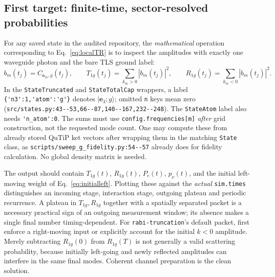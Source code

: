 \documentclass[11pt,a4paper]{article}
\newcommand{\ket}[1]{\lvert #1\rangle}
\newcommand{\code}[1]{\nolinkurl{#1}}
\begin{document}
\subsection{First target: finite-time, sector-resolved probabilities}
For any saved state in the audited repository, the \emph{mathematical} operation corresponding to Eq.~\eqref{eq:localTR} is to inspect the amplitudes with exactly one waveguide photon and the bare TLS ground label:
\begin{equation}
 b_m(t_j)=C_{\mathbf e_m,g}(t_j),\qquad
 T_{1g}(t_j)=\sum_{k_m>0}|b_m(t_j)|^2,\qquad
 R_{1g}(t_j)=\sum_{k_m<0}|b_m(t_j)|^2.
 \label{eq:bm}
\end{equation}
In the \code{StateTruncated} and \code{StateTotalCap} wrappers, a label \code{\{'n3':1,'atom':'g'\}} denotes $\ket{\mathbf e_3;g}$; omitted \code{n} keys mean zero (\code{src/states.py:43--53,66--87,140--167,232--248}). The \code{StateAtom} label also needs \code{'n_atom':0}. The sums must use \code{config.frequencies[m]} \emph{after} grid construction, not the requested mode count. One may compute these from already stored QuTiP ket vectors after wrapping them in the matching \code{State} class, as \code{scripts/sweep_g_fidelity.py:54--57} already does for fidelity calculation. No global density matrix is needed.

The output should contain $T_{1g}(t)$, $R_{1g}(t)$, $P_e(t)$, $p_\nu(t)$, and the initial left-moving weight of Eq.~\eqref{eq:initialleft}. Plotting these against the \emph{actual} \code{sim.times} distinguishes an incoming stage, interaction stage, outgoing plateau and periodic recurrence. A plateau in $T_{1g},R_{1g}$ together with a spatially separated packet is a necessary practical sign of an outgoing measurement window; its absence makes a single final number timing-dependent. For \code{rabi-truncation}'s default packet, first enforce a right-moving input or explicitly account for the initial $k<0$ amplitude. Merely subtracting $R_{1g}(0)$ from $R_{1g}(T)$ is not generally a valid scattering probability, because initially left-going and newly reflected amplitudes can interfere in the same final modes. Coherent channel preparation is the clean solution.
\end{document}
